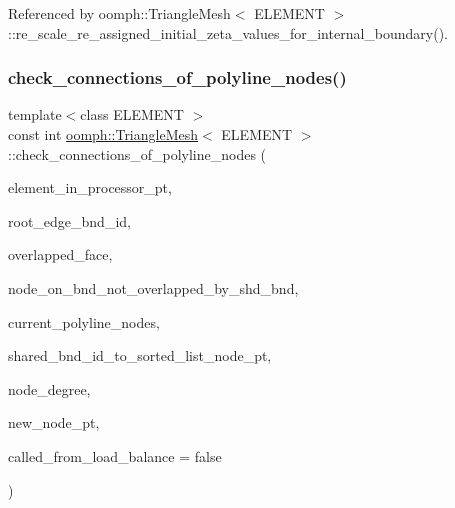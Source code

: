 Referenced by oomph\+::\+Triangle\+Mesh$<$ E\+L\+E\+M\+E\+N\+T $>$\+::re\+\_\+scale\+\_\+re\+\_\+assigned\+\_\+initial\+\_\+zeta\+\_\+values\+\_\+for\+\_\+internal\+\_\+boundary().

\mbox{\label{classoomph_1_1TriangleMesh_a243e3d1dbf7c545a707dff522678f755}} 
\subsubsection{\texorpdfstring{check\+\_\+connections\+\_\+of\+\_\+polyline\+\_\+nodes()}{check\_connections\_of\_polyline\_nodes()}}
{\footnotesize\ttfamily template$<$class E\+L\+E\+M\+E\+NT $>$ \\
const int \hyperlink{classoomph_1_1TriangleMesh}{oomph\+::\+Triangle\+Mesh}$<$ E\+L\+E\+M\+E\+NT $>$\+::check\+\_\+connections\+\_\+of\+\_\+polyline\+\_\+nodes (\begin{DoxyParamCaption}\item[{std\+::set$<$ \hyperlink{classoomph_1_1FiniteElement}{Finite\+Element} $\ast$$>$ \&}]{element\+\_\+in\+\_\+processor\+\_\+pt,  }\item[{const int \&}]{root\+\_\+edge\+\_\+bnd\+\_\+id,  }\item[{std\+::map$<$ std\+::pair$<$ \hyperlink{classoomph_1_1Node}{Node} $\ast$, \hyperlink{classoomph_1_1Node}{Node} $\ast$$>$, bool $>$ \&}]{overlapped\+\_\+face,  }\item[{std\+::map$<$ unsigned, std\+::map$<$ \hyperlink{classoomph_1_1Node}{Node} $\ast$, bool $>$ $>$ \&}]{node\+\_\+on\+\_\+bnd\+\_\+not\+\_\+overlapped\+\_\+by\+\_\+shd\+\_\+bnd,  }\item[{std\+::list$<$ \hyperlink{classoomph_1_1Node}{Node} $\ast$$>$ \&}]{current\+\_\+polyline\+\_\+nodes,  }\item[{std\+::map$<$ unsigned, std\+::list$<$ \hyperlink{classoomph_1_1Node}{Node} $\ast$$>$ $>$ \&}]{shared\+\_\+bnd\+\_\+id\+\_\+to\+\_\+sorted\+\_\+list\+\_\+node\+\_\+pt,  }\item[{const unsigned \&}]{node\+\_\+degree,  }\item[{\hyperlink{classoomph_1_1Node}{Node} $\ast$\&}]{new\+\_\+node\+\_\+pt,  }\item[{const bool}]{called\+\_\+from\+\_\+load\+\_\+balance = {\ttfamily false} }\end{DoxyParamCaption})\hspace{0.3cm}{\ttfamily [protected]}}




